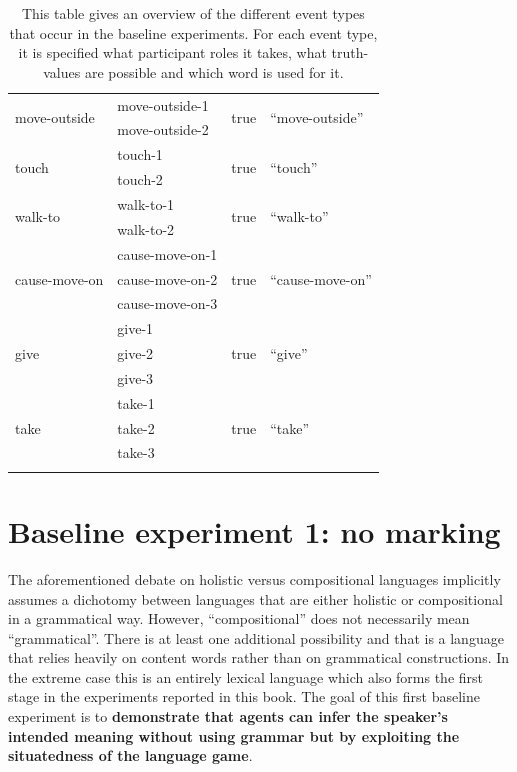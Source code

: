 \begin{table}[htp]
\begin{tabular}{llll}
\\[.3em]\multirow{2}{*}{move-outside } &  move-outside-1 & \multirow{2}{*}{true} & \multirow{2}{*}{``move-outside''}
\\
  &  move-outside-2 & &
\\[.3em]\multirow{2}{*}{touch } &   touch-1 & \multirow{2}{*}{true} & \multirow{2}{*}{``touch''}
\\
 &  touch-2 & &
\\[.3em]\multirow{2}{*}{walk-to } &  walk-to-1 & \multirow{2}{*}{true} & \multirow{2}{*}{``walk-to''}
\\
 &  walk-to-2 & &
\\[.3em]\multirow{3}{*}{cause-move-on } &  cause-move-on-1 & \multirow{3}{*}{true} & \multirow{3}{*}{``cause-move-on''}
\\
  &  cause-move-on-2  & &
\\
  &  cause-move-on-3  & &
\\[.3em]\multirow{3}{*}{   give } &  give-1 & \multirow{3}{*}{true} & \multirow{3}{*}{``give''}
\\
 &   give-2 & &
\\
  &  give-3  & &
\\[.3em]\multirow{3}{*}{take } & take-1 & \multirow{3}{*}{true} & \multirow{3}{*}{``take''}
\\
  &   take-2  & &
\\
 &   take-3  & &
\\
\lspbottomrule
 \end{tabular}
\caption[Event-types and their corresponding words]{This table gives an overview of the different event types that occur in the baseline experiments. For each event type, it is specified what participant roles it takes, what truth-values are possible and which word is used for it.}
\label{t:events}
\end{table}

\section{Baseline experiment 1: no marking}
\label{s:base1}

The aforementioned debate on holistic versus compositional languages implicitly assumes a dichotomy between languages that are either holistic or compositional in a grammatical way. However,  ``compositional'' does not necessarily mean ``grammatical''. There is at least one additional possibility and that is a language that relies heavily on content words rather than on grammatical constructions. In the extreme case this is an entirely lexical language which also forms the first stage in the experiments reported in this book. The goal of this first baseline experiment is to {\bfseries demonstrate that agents can infer the speaker's intended meaning without using grammar but by exploiting the situatedness of the language game}.

